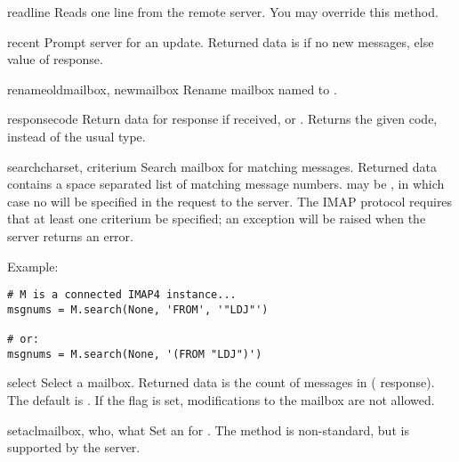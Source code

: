 \begin{methoddesc}{readline}{}
  Reads one line from the remote server.
  You may override this method.
\end{methoddesc}

\begin{methoddesc}{recent}{}
  Prompt server for an update. Returned data is  if no new
  messages, else value of  response.
\end{methoddesc}

\begin{methoddesc}{rename}{oldmailbox, newmailbox}
  Rename mailbox named  to .
\end{methoddesc}

\begin{methoddesc}{response}{code}
  Return data for response  if received, or
  . Returns the given code, instead of the usual type.
\end{methoddesc}

\begin{methoddesc}{search}{charset, criterium}
  Search mailbox for matching messages.  Returned data contains a space
  separated list of matching message numbers.   may be
  , in which case no  will be specified in the
  request to the server.  The IMAP protocol requires that at least one
  criterium be specified; an exception will be raised when the server
  returns an error.

  Example:

\begin{verbatim}
# M is a connected IMAP4 instance...
msgnums = M.search(None, 'FROM', '"LDJ"')

# or:
msgnums = M.search(None, '(FROM "LDJ")')
\end{verbatim}
\end{methoddesc}

\begin{methoddesc}{select}{}
  Select a mailbox. Returned data is the count of messages in
   ( response).  The default 
  is .  If the  flag is set, modifications
  to the mailbox are not allowed.
\end{methoddesc}

\begin{methoddesc}{setacl}{mailbox, who, what}
  Set an  for .
  The method is non-standard, but is supported by the  server.
\end{methoddesc}

